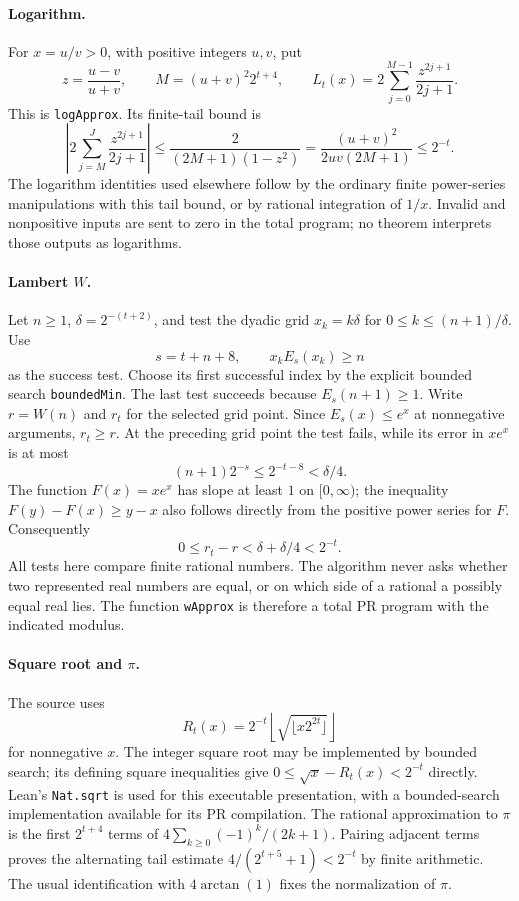 \paragraph{Logarithm.}
For $x=u/v>0$, with positive integers $u,v$, put
\[
 z=\frac{u-v}{u+v},\qquad
 M=(u+v)^2 2^{t+4},\qquad
 L_t(x)=2\sum_{j=0}^{M-1}\frac{z^{2j+1}}{2j+1}.
\]
This is \texttt{logApprox}. Its finite-tail bound is
\[
 \left|2\sum_{j=M}^{J}\frac{z^{2j+1}}{2j+1}\right|
 \le\frac{2}{(2M+1)(1-z^2)}
 =\frac{(u+v)^2}{2uv(2M+1)}
 \le2^{-t}.
\]
The logarithm identities used elsewhere follow by the ordinary finite
power-series manipulations with this tail bound, or by rational
integration of $1/x$. Invalid and nonpositive inputs are sent to zero in
the total program; no theorem interprets those outputs as logarithms.

\paragraph{Lambert $W$.}
Let $n\ge1$, $\delta=2^{-(t+2)}$, and test the dyadic grid
$x_k=k\delta$ for $0\le k\le(n+1)/\delta$. Use
\[
 s=t+n+8,
 \qquad x_kE_s(x_k)\ge n
\]
as the success test. Choose its first successful index by the explicit
bounded search \texttt{boundedMin}. The last test succeeds because
$E_s(n+1)\ge1$. Write $r=W(n)$ and $r_t$ for the selected grid point.
Since $E_s(x)\le e^x$ at nonnegative arguments, $r_t\ge r$.
At the preceding grid point the test fails, while its error in $xe^x$ is
at most
\[
 (n+1)2^{-s}\le2^{-t-8}<\delta/4.
\]
The function $F(x)=xe^x$ has slope at least $1$ on $[0,\infty)$; the
inequality $F(y)-F(x)\ge y-x$ also follows directly from the positive
power series for $F$. Consequently
\[
 0\le r_t-r<\delta+\delta/4<2^{-t}.
\]
All tests here compare finite rational numbers. The algorithm never asks
whether two represented real numbers are equal, or on which side of a
rational a possibly equal real lies. The function \texttt{wApprox} is
therefore a total PR program with the indicated modulus.

\paragraph{Square root and $\pi$.}
The source uses
\[
 R_t(x)=2^{-t}\left\lfloor
 \sqrt{\lfloor x2^{2t}\rfloor}\right\rfloor
\]
for nonnegative $x$. The integer square root may be implemented by bounded
search; its defining square inequalities give
$0\le\sqrt{x}-R_t(x)<2^{-t}$ directly. Lean's \texttt{Nat.sqrt} is used
for this executable presentation, with a bounded-search implementation
available for its PR compilation. The rational approximation to $\pi$ is
the first $2^{t+4}$ terms of
$4\sum_{k\ge0}(-1)^k/(2k+1)$. Pairing adjacent terms proves the alternating
tail estimate $4/(2^{t+5}+1)<2^{-t}$ by finite arithmetic. The usual
identification with $4\arctan(1)$ fixes the normalization of $\pi$.


